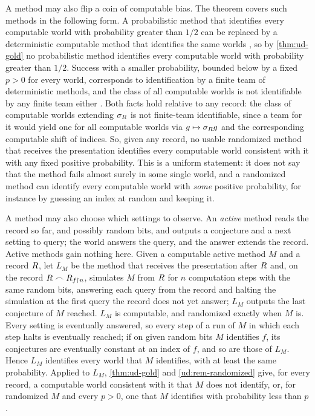 \begin{remark}\label{ud:rem-randomized}
A method may also flip a coin of computable bias. The theorem covers such methods in
the following form. A probabilistic method
that identifies every computable world with probability greater than $1/2$ can be
replaced by a deterministic computable method that identifies the same worlds
\citep[Thm.~3.21 with $n=1$]{pitt1989}, so by \cref{thm:ud-gold} no probabilistic method identifies every
computable world with probability greater than $1/2$. Success with a smaller probability, bounded below by
a fixed $p>0$ for every world, corresponds to identification by a finite team of
deterministic methods, and the class of all computable worlds is not identifiable by
any finite team either \citetext{\citealp[Thm.~3.36]{pitt1989}; \citealp[Thm.~3.1]{smith1982}; \citealp{pitt-smith1988}}. Both facts hold
relative to any record: the class of computable worlds extending $\sigma_R$ is not
finite-team identifiable, since a team for it would yield one for all computable worlds
via $g\mapsto\sigma_R g$ and the corresponding computable shift of indices. So, given
any record, no usable randomized method that receives the presentation identifies every
computable world consistent with it with any fixed positive probability. This is a
uniform statement: it does not say that the method fails almost surely in some single
world, and a randomized method can identify every computable world with \emph{some}
positive probability, for instance by guessing an index at random and keeping it.
\end{remark}

\begin{remark}\label{rem:active}
A method may also choose which settings to observe. An \emph{active} method reads the
record so far, and possibly random bits, and outputs a conjecture and a next setting to
query; the world answers the query, and the answer extends the record. Active methods
gain nothing here. Given a computable active method $M$ and a record $R$, let $L_M$
be the method that receives the presentation after $R$ and, on the record
$R\frown R_{f\restriction n}$, simulates $M$ from $R$ for $n$ computation steps
with the same random bits, answering each query from the record and halting the
simulation at the first query the record does not yet answer; $L_M$ outputs the last
conjecture of $M$ reached. $L_M$ is computable, and randomized exactly when $M$ is.
Every setting is eventually answered, so every step of a run of $M$ in which each
step halts is eventually reached; if on given random bits $M$ identifies $f$, its
conjectures are eventually constant at an index of $f$, and so are those of $L_M$.
Hence $L_M$ identifies every world that $M$ identifies, with at least the same
probability. Applied to $L_M$, \cref{thm:ud-gold} and \cref{ud:rem-randomized} give,
for every record, a computable world consistent with it that $M$ does not identify, or,
for randomized $M$ and every $p>0$, one that $M$ identifies with probability less than
$p$.
\end{remark}

